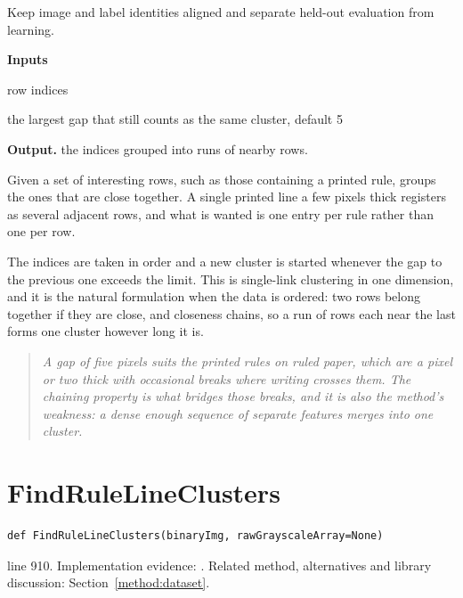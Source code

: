 Keep image and label identities aligned and separate held-out evaluation from learning.




\noindent\textbf{Inputs}
\begin{description}[leftmargin=2.2em,style=nextline,font=\normalfont\ttfamily]\setlength\itemsep{1pt}
  \item[{rows}] \normalfont row indices
  \item[{maxGap}] \normalfont the largest gap that still counts as the same cluster, default 5
\end{description}

\noindent\textbf{Output.} the indices grouped into runs of nearby rows.


Given a set of interesting rows, such as those containing a printed rule, groups the ones that are close together. A single printed line a few pixels thick registers as several adjacent rows, and what is wanted is one entry per rule rather than one per row.


The indices are taken in order and a new cluster is started whenever the gap to the previous one exceeds the limit. This is single-link clustering in one dimension, and it is the natural formulation when the data is ordered: two rows belong together if they are close, and closeness chains, so a run of rows each near the last forms one cluster however long it is.


\begin{quote}\small\itshape A gap of five pixels suits the printed rules on ruled paper, which are a pixel or two thick with occasional breaks where writing crosses them. The chaining property is what bridges those breaks, and it is also the method's weakness: a dense enough sequence of separate features merges into one cluster.\end{quote}


\section{FindRuleLineClusters}\label{fn:train:FindRuleLineClusters}
\begin{lstlisting}[style=sig]
def FindRuleLineClusters(binaryImg, rawGrayscaleArray=None)
\end{lstlisting}
 line 910. Implementation evidence: \cite{code2026}. Related method, alternatives and library discussion: Section~\ref{method:dataset}.


